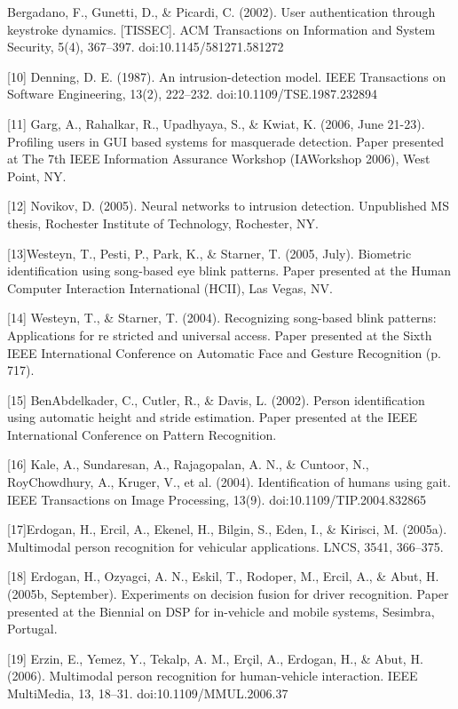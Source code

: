 \documentclass{article}
\begin{document}
\begin{raggedright}
[9] Bergadano, F., Gunetti, D., \& Picardi, C. (2002). User authentication through keystroke dynamics. [TISSEC]. ACM Transactions on Information and System Security, 5(4), 367–397. doi:10.1145/581271.581272

[10] Denning, D. E. (1987). An intrusion-detection model. IEEE Transactions on Software Engineering, 13(2), 222–232. doi:10.1109/TSE.1987.232894

[11] Garg, A., Rahalkar, R., Upadhyaya, S., \& Kwiat, K. (2006, June 21-23). Profiling users in GUI based systems for masquerade detection. Paper presented at The 7th IEEE Information Assurance Workshop (IAWorkshop 2006), West Point, NY.

[12] Novikov, D. (2005). Neural networks to intrusion detection. Unpublished MS thesis, Rochester Institute of Technology, Rochester, NY.

[13]Westeyn, T., Pesti, P., Park, K., \& Starner, T. (2005, July). Biometric identification using song-based eye blink patterns. Paper presented at the Human Computer Interaction International (HCII), Las Vegas, NV.

[14] Westeyn, T., \& Starner, T. (2004). Recognizing song-based blink patterns: Applications for re stricted and universal access. Paper presented at the Sixth IEEE International Conference on Automatic Face and Gesture Recognition (p. 717).

[15]  BenAbdelkader, C., Cutler, R., \& Davis, L. (2002). Person identification using automatic height and stride estimation. Paper presented at the IEEE International Conference on Pattern Recognition.

[16] Kale, A., Sundaresan, A., Rajagopalan, A. N., \& Cuntoor, N., RoyChowdhury, A., Kruger, V., et al. (2004). Identification of humans using gait. IEEE Transactions on Image Processing, 13(9). doi:10.1109/TIP.2004.832865

[17]Erdogan, H., Ercil, A., Ekenel, H., Bilgin, S., Eden, I., \& Kirisci, M. (2005a). Multimodal person recognition for vehicular applications. LNCS, 3541, 366–375.

[18] Erdogan, H., Ozyagci, A. N., Eskil, T., Rodoper, M., Ercil, A., \& Abut, H. (2005b, September). Experiments on decision fusion for driver recognition. Paper presented at the Biennial on DSP for in-vehicle and mobile systems, Sesimbra, Portugal.

[19] Erzin, E., Yemez, Y., Tekalp, A. M., Erçil, A., Erdogan, H., \& Abut, H. (2006). Multimodal person recognition for human-vehicle interaction. IEEE MultiMedia, 13, 18–31. doi:10.1109/MMUL.2006.37


\end{raggedright}
\end{document}
